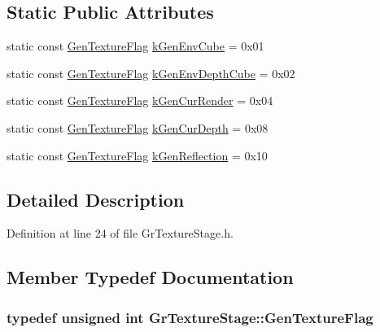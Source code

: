 \begin{CompactItemize}
\subsection*{Static Public Attributes}
\begin{CompactItemize}
\item 
static const \hyperlink{class_gr_texture_stage_60f59a039bf1c95b76659752ff1bf7d6}{GenTextureFlag} \hyperlink{class_gr_texture_stage_c8c9e946cb577f989ca9fc7a922858c8}{kGenEnvCube} = 0x01
\item 
static const \hyperlink{class_gr_texture_stage_60f59a039bf1c95b76659752ff1bf7d6}{GenTextureFlag} \hyperlink{class_gr_texture_stage_ba5017eeaf633d3301825798bc63ac88}{kGenEnvDepthCube} = 0x02
\item 
static const \hyperlink{class_gr_texture_stage_60f59a039bf1c95b76659752ff1bf7d6}{GenTextureFlag} \hyperlink{class_gr_texture_stage_2e5a1af71fd34ff5f174493b3da79496}{kGenCurRender} = 0x04
\item 
static const \hyperlink{class_gr_texture_stage_60f59a039bf1c95b76659752ff1bf7d6}{GenTextureFlag} \hyperlink{class_gr_texture_stage_9aaa704c6b85414a990ba3327e83ccf2}{kGenCurDepth} = 0x08
\item 
static const \hyperlink{class_gr_texture_stage_60f59a039bf1c95b76659752ff1bf7d6}{GenTextureFlag} \hyperlink{class_gr_texture_stage_1af32ceaadafc4e51e34f1e143476176}{kGenReflection} = 0x10
\end{CompactItemize}


\subsection{Detailed Description}


Definition at line 24 of file GrTextureStage.h.

\subsection{Member Typedef Documentation}
\hypertarget{class_gr_texture_stage_60f59a039bf1c95b76659752ff1bf7d6}{
\subsubsection[{GenTextureFlag}]{\setlength{\rightskip}{0pt plus 5cm}typedef unsigned int {\bf GrTextureStage::GenTextureFlag}}}
\label{class_gr_texture_stage_60f59a039bf1c95b76659752ff1bf7d6}





\end{CompactItemize}

